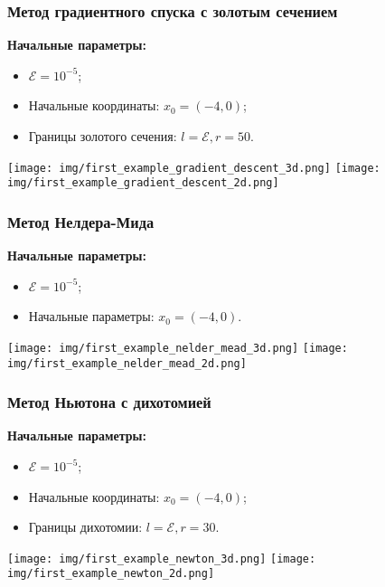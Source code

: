 \documentclass{article}
\begin{document}
\subsubsection*{Метод градиентного спуска с золотым сечением}
\textbf{Начальные параметры:}
\begin{itemize}
    \item $\mathcal{E} = 10^{-5}$;
    \item Начальные координаты: $x_0 = (-4, 0)$;
    \item Границы золотого сечения: $l = \mathcal{E}, r = 50$.
\end{itemize}
\begin{center}
    \texttt{[image: img/first\_example\_gradient\_descent\_3d.png]}
    \texttt{[image: img/first\_example\_gradient\_descent\_2d.png]}
    \label{fig:enter-label}
\end{center}
\subsubsection*{Метод Нелдера-Мида}
\textbf{Начальные параметры:}
\begin{itemize}
    \item $\mathcal{E} = 10^{-5}$;
    \item Начальные параметры: $x_0 = (-4, 0)$.
\end{itemize}
\begin{center}
    \texttt{[image: img/first\_example\_nelder\_mead\_3d.png]}
    \texttt{[image: img/first\_example\_nelder\_mead\_2d.png]}
    \label{fig:enter-label}
\end{center}
\subsubsection*{Метод Ньютона с дихотомией}
\textbf{Начальные параметры:}
\begin{itemize}
    \item $\mathcal{E} = 10^{-5}$;
    \item Начальные координаты: $x_0 = (-4, 0)$;
    \item Границы дихотомии: $l = \mathcal{E}, r = 30$.
\end{itemize}
\begin{center}
    \texttt{[image: img/first\_example\_newton\_3d.png]}
    \texttt{[image: img/first\_example\_newton\_2d.png]}
    \label{fig:enter-label}
\end{center}
\newpage
\end{document}
